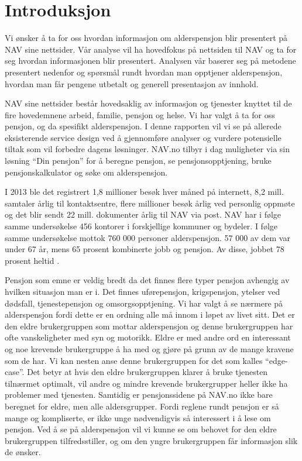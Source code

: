 \documentclass[informationsecurity]{gucmasterproject}
\begin{document}
\tableofcontents


\chapter{Introduksjon}
Vi ønsker å ta for oss hvordan informasjon om alderspensjon blir presentert på NAV sine nettsider. Vår analyse vil ha hovedfokus på nettsiden til NAV og ta for seg hvordan informasjonen blir presentert. Analysen vår baserer seg på metodene presentert nedenfor og spørsmål rundt hvordan man opptjener alderspensjon, hvordan man får pengene utbetalt og generell presentasjon av innhold.

NAV sine nettsider består hovedsaklig av informasjon og tjenester knyttet til de fire hovedemnene arbeid, familie, pensjon og helse. Vi har valgt å ta for oss pensjon, og da spesifikt alderspensjon. I denne rapporten vil vi se på allerede eksisterende service design ved å gjennomføre analyser og vurdere potensielle tiltak som vil forbedre dagens løsninger. NAV.no tilbyr i dag muligheter via sin løsning “Din pensjon” for å beregne pensjon, se pensjonsopptjening, bruke pensjonskalkulator og søke om alderspensjon.

I 2013 ble det registrert 1,8 millioner besøk hver måned på internett, 8,2 mill. samtaler årlig til kontaktsentre, flere millioner besøk årlig ved personlig oppmøte og det blir sendt 22 mill. dokumenter årlig til NAV via post. NAV har i følge samme undersøkelse 456 kontorer i forskjellige kommuner og bydeler. I følge samme undersøkelse mottok 760 000 personer alderspensjon. 57 000 av dem var under 67 år, mens 65 prosent kombinerte jobb og pensjon. Av disse, jobbet 78 prosent heltid \cite{faktaogtall}.

Pensjon som emne er veldig bredt da det finnes flere typer pensjon avhengig av hvilken situasjon man er i. Det finnes uførepensjon, krigspensjon, ytelser ved dødsfall, tjenestepensjon og omsorgsopptjening. Vi har valgt å se nærmere på alderspensjon fordi dette er en ordning alle må innom i løpet av livet sitt. Det er den eldre brukergruppen som mottar alderspensjon og denne brukergruppen har ofte vanskeligheter med syn og motorikk. Eldre er med andre ord en interessant og noe krevende brukergruppe å ha med og gjøre på grunn av de mange kravene som de har. Vi kan nesten anse denne brukergruppen for det som kalles “edge-case”. Det betyr at hvis den eldre brukergruppen klarer å bruke tjenesten tilnærmet optimalt, vil andre og mindre krevende brukergrupper heller ikke ha problemer med tjenesten. Samtidig er pensjonssidene på NAV.no ikke bare beregnet for eldre, men alle aldersgrupper. Fordi reglene rundt pensjon er så mange og kompliserte, er ikke unge nødvendigvis så interessert i å lese om pensjon. Ved å se på alderspensjon vil vi kunne se om behovet for den eldre brukergruppen tilfredsstiller, og om den yngre brukergruppen får informasjon slik de ønsker.
\end{document}
